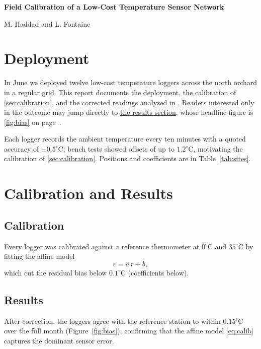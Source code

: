 \documentclass[11pt]{report}
\begin{document}
\begin{center}
  {\Large\bfseries Field Calibration of a Low-Cost Temperature Sensor Network\par}
  \vspace{0.5em}
  {M. Haddad and L. Fontaine\par}
\end{center}

\chapter{Deployment}
\label{ch:deployment}

In June we deployed twelve low-cost temperature loggers across the north
orchard in a regular grid. This report documents the deployment, the
calibration of \autoref{sec:calibration}, and the corrected readings
analyzed in . Readers interested only in the outcome
may jump directly to \hyperref[sec:results]{the results section}, whose
headline figure is \autoref{fig:bias} on page~\pageref{fig:bias}.

Each logger records the ambient temperature every ten minutes with a
quoted accuracy of $\pm 0.5^{\circ}$C; bench tests showed offsets of up to
$1.2^{\circ}$C, motivating the calibration of \autoref{sec:calibration}.
Positions and coefficients are in Table~\ref{tab:sites}.

\chapter{Calibration and Results}
\label{ch:main}

\section{Calibration}
\label{sec:calibration}

Every logger was calibrated against a reference thermometer at
$0^{\circ}$C and $35^{\circ}$C by fitting the affine model
\begin{equation}
  \label{eq:calib}
  c = a\, r + b,
\end{equation}
which cut the residual bias below $0.1^{\circ}$C (coefficients below).

\section{Results}
\label{sec:results}

After correction, the loggers agree with the reference station to within
$0.15^{\circ}$C over the full month (Figure~\ref{fig:bias}), confirming that
the affine model \eqref{eq:calib} captures the dominant sensor error.
\end{document}
